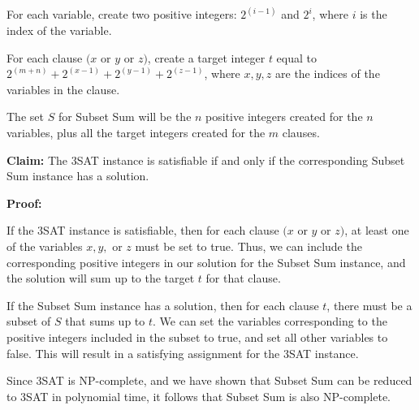 For each variable, create two positive integers: $2^{(i-1)}$ and $2^{i}$, where $i$ is the index of the variable.

For each clause $(x$ or $y$ or $z)$, create a target integer $t$ equal to $2^{(m+n)} + 2^{(x-1)} + 2^{(y-1)} + 2^{(z-1)}$, where $x, y, z$ are the indices of the variables in the clause.

The set $S$ for Subset Sum will be the $n$ positive integers created for the $n$ variables, plus all the target integers created for the $m$ clauses.

\textbf{Claim:} The 3SAT instance is satisfiable if and only if the corresponding Subset Sum instance has a solution.

\textbf{Proof:}

If the 3SAT instance is satisfiable, then for each clause $(x$ or $y$ or $z)$, at least one of the variables $x, y,$ or $z$ must be set to true. Thus, we can include the corresponding positive integers in our solution for the Subset Sum instance, and the solution will sum up to the target $t$ for that clause.

If the Subset Sum instance has a solution, then for each clause $t$, there must be a subset of $S$ that sums up to $t$. We can set the variables corresponding to the positive integers included in the subset to true, and set all other variables to false. This will result in a satisfying assignment for the 3SAT instance.

Since 3SAT is NP-complete, and we have shown that Subset Sum can be reduced to 3SAT in polynomial time, it follows that Subset Sum is also NP-complete.
%